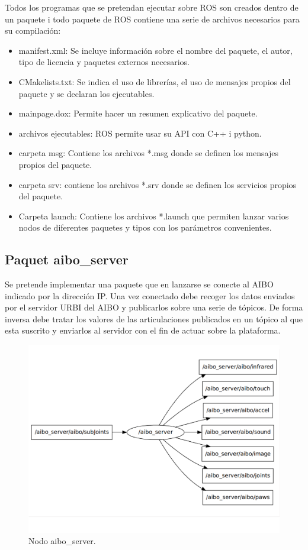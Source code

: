\documentclass[12pt,a4paper,final,twoside]{book}
\begin{document}
Todos los programas que se pretendan ejecutar sobre ROS son creados dentro de un paquete i todo paquete de ROS contiene una serie de archivos necesarios para su compilación:
\begin{itemize}
\item manifest.xml: Se incluye información sobre el nombre del paquete, el autor, tipo de licencia y paquetes externos necesarios.
\item CMakelists.txt: Se indica el uso de librerías, el uso de mensajes propios del paquete y se declaran los ejecutables.
\item mainpage.dox: Permite hacer un resumen explicativo del paquete.
\item archivos ejecutables: ROS permite usar su API con C++ i python.
\item carpeta msg: Contiene los archivos *.msg donde se definen los mensajes propios del paquete.
\item carpeta srv: contiene los archivos *.srv donde se definen los servicios propios del paquete.
\item Carpeta launch: Contiene los archivos *.launch que permiten lanzar varios nodos de diferentes paquetes y tipos con los parámetros convenientes.

\end{itemize}
\subsection{Paquet aibo{\_}server }
Se pretende implementar una paquete que en lanzarse se conecte al AIBO indicado por la dirección IP. Una vez conectado debe recoger los datos enviados por el servidor URBI del AIBO y publicarlos sobre una serie de tópicos. De forma inversa debe tratar los valores de las articulaciones publicados en un tópico al que esta suscrito y enviarlos al servidor con el fin de actuar sobre la plataforma.

\begin{figure}[H]
	\centering
    \includegraphics[scale=0.6]{images/aiboserverNodo.pdf}
	 \caption{Nodo aibo{\_}server.}
  \label{fig:aiboserv}
\end{figure}
\end{document}
